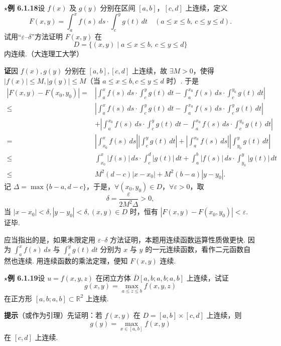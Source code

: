 \documentclass[UTF8, 12pt, fontset=fandol, oneside]{ctexart}
\begin{document}
\noindent\textbf{$\star$例 6.1.18}\quad 设 $f(x)$ 及 $g(y)$ 分别在区间 $[a,b]$，$[c,d]$ 上连续，定义
\[
  F(x,y)=\int_a^x f(s)\,ds\cdot\int_c^y g(t)\,dt
  \quad(a\le x\le b,\ c\le y\le d).
\]
试用“$\varepsilon$--$\delta$”方法证明 $F(x,y)$ 在
\[
  D=\{(x,y)\mid a\le x\le b,\ c\le y\le d\}
\]
内连续.（大连理工大学）

\noindent\textbf{证}\quad 因 $f(x),g(y)$ 分别在 $[a,b],[c,d]$ 上连续，故 $\exists M>0$，使得 $|f(x)|\le M,|g(y)|\le M$（当 $a\le x\le b,c\le y\le d$ 时）. 于是
\[
\begin{aligned}
|F(x,y)-F(x_0,y_0)|
={}&\left|\int_a^x f(s)\,ds\cdot\int_c^y g(t)\,dt
-\int_a^{x_0} f(s)\,ds\cdot\int_c^{y_0} g(t)\,dt\right|\\
\le{}&\left|\int_a^x f(s)\,ds\cdot\int_c^y g(t)\,dt
-\int_a^{x_0} f(s)\,ds\cdot\int_c^y g(t)\,dt\right|\\
&+\left|\int_a^{x_0} f(s)\,ds\cdot\int_c^y g(t)\,dt
-\int_a^{x_0} f(s)\,ds\cdot\int_c^{y_0} g(t)\,dt\right|\\
={}&\left|\int_{x_0}^x f(s)\,ds\right|
\left|\int_c^y g(t)\,dt\right|
+\left|\int_a^{x_0} f(s)\,ds\right|
\left|\int_{y_0}^y g(t)\,dt\right|\\
\le{}&\int_{x_0}^x |f(s)|\,ds\cdot\int_c^d |g(t)|\,dt
+\int_a^b |f(s)|\,ds\cdot\int_{y_0}^y |g(t)|\,dt\\
\le{}&M^2(d-c)|x-x_0|+M^2(b-a)|y-y_0|.
\end{aligned}
\]
记 $\Delta=\max\{b-a,d-c\}$，于是，$\forall(x_0,y_0)\in D$，$\forall\varepsilon>0$，取
\[
  \delta=\frac{\varepsilon}{2M^2\Delta}>0,
\]
当 $|x-x_0|<\delta,|y-y_0|<\delta,(x,y)\in D$ 时，恒有 $|F(x,y)-F(x_0,y_0)|<\varepsilon$. 证毕.

应当指出的是，如果未限定用 $\varepsilon$--$\delta$ 方法证明，本题用连续函数运算性质做更快. 因为 $\int_a^x f(s)\,ds$ 与 $\int_c^y g(t)\,dt$ 分别为 $x$ 与 $y$ 的一元连续函数，看作二元函数自然也连续. 用连续函数的乘法定理，便知 $F(x,y)$ 连续.

\noindent\textbf{$\star$例 6.1.19}\quad 设 $u=f(x,y,z)$ 在闭立方体 $\overline D[a,b;a,b;a,b]$ 上连续，试证
\[
  g(x,y)=\max_{a\le z\le b} f(x,y,z)
\]
在正方形 $[a,b;a,b]\subset\mathbb{R}^2$ 上连续.

\noindent\textbf{提示}\quad （或作为引理）先证明：若 $f(x,y)$ 在 $D=[a,b]\times[c,d]$ 上连续，则
\[
  g(y)=\max_{x\in[a,b]} f(x,y)
\]
在 $[c,d]$ 上连续.
\end{document}
